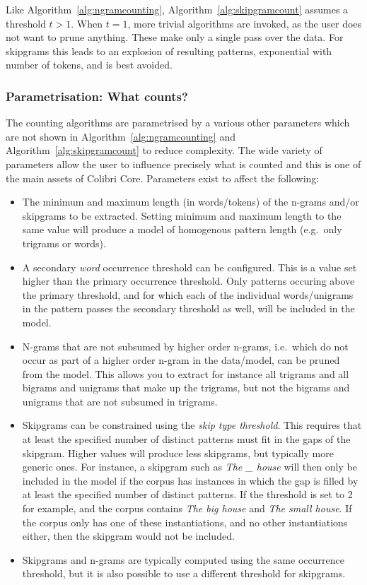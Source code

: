 \documentclass[a4paper,12pt]{article}
\begin{document}
Like Algorithm~\ref{alg:ngramcounting}, Algorithm~\ref{alg:skipgramcount}
assumes a threshold $t>1$. When $t=1$, more trivial algorithms are
invoked, as the user does not want to prune anything. These make only a single
pass over the data. For skipgrams this leads to an explosion of
resulting patterns, exponential with number of tokens, and is best avoided.

\subsubsection{Parametrisation: What counts?}
\label{sec:whatcounts}

The counting algorithms are parametrised by a various other parameters which
are not shown in Algorithm~\ref{alg:ngramcounting} and
Algorithm~\ref{alg:skipgramcount} to reduce complexity. The wide variety of
parameters allow the user to influence precisely what is counted and this is one
of the main assets of Colibri Core. Parameters exist to affect the following:

\begin{itemize}
    \item The minimum and maximum length (in words/tokens) of the n-grams
        and/or skipgrams to be extracted. Setting minimum and maximum length to
        the same value will produce a model of homogenous pattern length
        (e.g.\ only trigrams or words).
    \item A secondary \emph{word} occurrence threshold can be configured. This is a value set higher than
        the primary occurrence threshold. Only patterns
        occuring above the primary threshold, and for which each of the
        individual words/unigrams in the pattern passes the secondary threshold as well, will
        be included in the model.
    \item N-grams that are not subsumed by higher order n-grams, i.e.\ which do
        not  occur as part of a higher order n-gram in the data/model, can be pruned
        from the model. This allows you to extract for instance all trigrams
        and all bigrams and unigrams that make up the trigrams, but not the
        bigrams and unigrams that are not subsumed in trigrams. 
    \item Skipgrams can be constrained using the \emph{skip type threshold}. This
        requires that at least the specified number of distinct patterns must fit in the
        gaps of the skipgram. Higher values will produce less skipgrams, but
        typically more generic ones. For instance, a skipgram such as \emph{The \_ house} will
        then only be included in the model if the corpus has instances in which the gap is
        filled by at least the specified number of distinct patterns. 
        If the threshold is set to 2 for example, and the corpus contains \emph{The
        big house} and \emph{The small house}. If the corpus only has
        one of these instantiations, and no other instantiations either, then the skipgram would not be included.
    \item Skipgrams and n-grams are typically computed using the same
        occurrence threshold, but it is also possible to use a different threshold
        for skipgrams.
\end{itemize}
\end{document}
